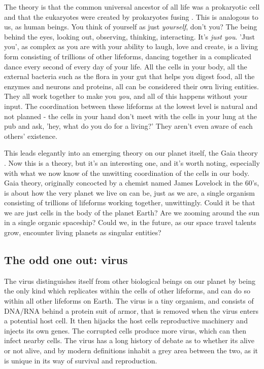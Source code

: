 The theory is that the common universal ancestor of all life was a prokaryotic cell and that the eukaryotes were created by prokaryotes fusing \cite{ProcaEuka}.
This is analogous to us, as human beings. You think of yourself as just \textit {yourself}, don't you? The being behind the eyes, looking out, observing, thinking, interacting.
It's \textit{just you}.
'Just you', as complex as you are with your ability to laugh, love and create, is a living form consisting of trillions of other lifeforms, dancing together in a complicated dance every second of every day of your life.
All the cells in your body, all the external bacteria such as the flora in your gut that helps you digest food, all the enzymes and neurons and proteins, all can be considered their own living entities.
They all work together to make you \textit{you}, and all of this happens without your input.
The coordination between these lifeforms at the lowest level is natural and not planned - the cells in your hand don't meet with the cells in your lung at the pub and ask, 'hey, what do you do for a living?'
They aren't even aware of each others' existence.

This leads elegantly into an emerging theory on our planet itself, the Gaia theory \cite{Lovelock}.
Now this is a theory, but it's an interesting one, and it's worth noting, especially with what we now know of the unwitting coordination of the cells in our body.
Gaia theory, originally concocted by a chemist named James Lovelock in the 60's, is about how the very planet we live on can be, just as we are, a single organism consisting of trillions of lifeforms working together, unwittingly.
Could it be that we are just cells in the body of the planet Earth?
Are we zooming around the sun in a single organic spaceship?
Could we, in the future, as our space travel talents grow, encounter living planets as singular entities?

\subsection*{The odd one out: virus}

The virus distinguishes itself from other biological beings on our planet by being the only kind which replicates within the cells of other lifeforms, and can do so within all other lifeforms on Earth\cite{koonin}. The virus is a tiny organism, and consists of DNA/RNA behind a protein suit of armor, that is removed when the virus enters a potential host cell. It then hijacks the host cells reproductive machinery and injects its own genes. The corrupted cells produce more virus, which can then infect nearby cells\cite{villareal}. The virus has a long history of debate as to whether its alive or not alive, and by modern definitions inhabit a grey area between the two, as it is unique in its way of survival and reproduction.